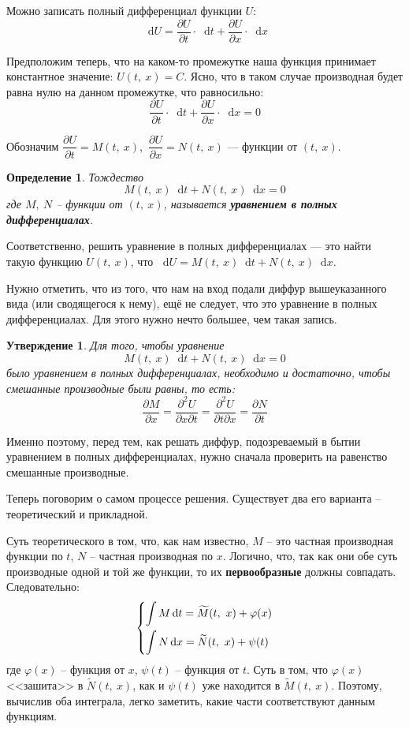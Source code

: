 \documentclass[a4paper,12pt]{article}
\newtheorem{definition}{Определение}
\newtheorem{statement}{Утверждение}
\renewcommand*\d{\mathop{}\!\mathrm{d}}
\newcommand{\fe}{\varphi}
\newcommand{\ds}{\displaystyle}
\begin{document}
Можно записать полный дифференциал функции $U$:
\[\d U = \dfrac{\partial U}{\partial t}\cdot \d t + \dfrac{\partial U}{\partial x}\cdot \d x\]

Предположим теперь, что на каком-то промежутке наша функция принимает константное значение: $U(t,\ x) = C$. Ясно, что в таком случае производная будет равна нулю на данном промежутке, что равносильно:
\[\dfrac{\partial U}{\partial t}\cdot \d t + \dfrac{\partial U}{\partial x}\cdot \d x = 0\]

Обозначим $\dfrac{\partial U}{\partial t} = M(t,\ x)$,\ $\dfrac{\partial U}{\partial x} = N(t,\ x)$ --- функции от $(t,\ x)$. 
\begin{definition}
	Тождество
	\[M(t,\ x)\d t + N(t,\ x)\d x = 0\] где $M,\ N$ -- функции от $(t,\ x)$, называется \textbf{уравнением в полных дифференциалах}.
\end{definition}

Соответственно, решить уравнение в полных дифференциалах --- это найти такую функцию $U(t,\ x)$, что $\d U = M(t,\ x)\d t + N(t,\ x)\d x$.

Нужно отметить, что из того, что нам на вход подали диффур вышеуказанного вида (или сводящегося к нему), ещё не следует, что это уравнение в полных дифференциалах. Для этого нужно нечто большее, чем такая запись.
\begin{statement}
	Для того, чтобы уравнение \[M(t,\ x)\d t + N(t,\ x)\d x = 0\] было уравнением в полных дифференциалах, необходимо и достаточно, чтобы смешанные производные были равны, то есть:
	\[\dfrac{\partial M}{\partial x} = \dfrac{\partial^2 U}{\partial x\partial t} = \dfrac{\partial^2 U}{\partial t\partial x} = \dfrac{\partial N}{\partial t}\]
\end{statement}
Именно поэтому, перед тем, как решать диффур, подозреваемый в бытии уравнением в полных дифференциалах, нужно сначала проверить на равенство смешанные производные.

Теперь поговорим о самом процессе решения. Существует два его варианта -- теоретический и прикладной.

Суть теоретического в том, что, как нам известно, $M$ -- это частная производная функции по $t$, $N$ -- частная производная по $x$. Логично, что, так как они обе суть производные одной и той же функции, то их \textbf{первообразные} должны совпадать. Следовательно:
\[\left\{\begin{gathered}
\ds\int M\d t = \widetilde{M}(t,\ x) + \varphi(x)\hfill\\
\ds\int N\d x = \widetilde{N}(t,\ x) + \psi(t)\hfill
\end{gathered}\right.\]
где $\varphi(x)$ -- функция от $x$, $\psi(t)$ -- функция от $t$. Суть в том, что $\fe(x)$ <<зашита>> в $\widetilde{N}(t,\ x)$, как и $\psi(t)$ уже находится в $\widetilde{M}(t,\ x)$. Поэтому, вычислив оба интеграла, легко заметить, какие части соответствуют данным функциям.
\end{document}
